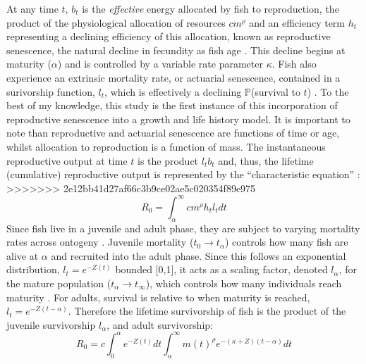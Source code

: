 \documentclass[a4paper]{article} %
\begin{document}
\begin{center}
\begin{minipage}{\linewidth}
At any time $t$, $b_{t}$ is the \textit{effective} energy allocated by fish to reproduction, the product of the physiological allocation of resources $cm^{\rho}$ and an efficiency term $h_t$ representing a declining efficiency of this allocation, known as reproductive senescence, the natural decline in fecundity as fish age \autocite{Stearns2000, Benoit2018, Vrtilek2018}. This decline begins at maturity ($\alpha$) and is controlled by a variable rate parameter $\kappa$. Fish also experience an extrinsic mortality rate, or actuarial senescence, contained in a surivorship function, $l_t$, which is effectively a declining $\mathbb{P}$(survival to $t$) \autocite{Beverton1959, Peterson1984, Charnov1993,Walters1993, Charnov2001, Benoit2018, Laird2010, Reznick2002, Reznick2006}. To the best of my knowledge, this study is the first instance of this incorporation of reproductive senescence into a growth and life history model. It is important to note than reproductive and actuarial senescence are functions of time or age, whilst allocation to reproduction is a function of mass. The instantaneous reproductive output at time $t$ is the product $l_{t}b_{t}$ and, thus, the lifetime (cumulative) reproductive output is represented by the ``characteristic equation'' \autocite{roff1992evolution, roff2002life, stearns1992evolution, Arendt2011, Tsoukali2016}:
>>>>>>> 2e12bb41d27af66c3b9ce02ae5c020354f89e975
\begin{equation}
    R_{0} = \int_{\alpha}^{\infty}cm^{\rho}h_{t}l_t dt
\end{equation}
Since fish live in a juvenile and adult phase, they are subject to varying mortality rates across ontogeny \autocite{Charnov2001}. Juvenile mortality ($t_0 \rightarrow t_{\alpha}$) controls how many fish are alive at $\alpha$ and recruited into the adult phase. Since this follows an exponential distribution, $l_t = e^{-Z(t)}$ bounded [0,1], it acts as a scaling factor, denoted $l_{\alpha}$, for the mature population ($t_{\alpha} \rightarrow t_{\infty}$), which controls how many individuals reach maturity \autocite{Charnov1990-agematurity}. For adults, survival is relative to when maturity is reached, $l_{t} = e^{-Z(t-\alpha)}$. Therefore the lifetime survivorship of fish is the product of the juvenile survivorship $l_{\alpha}$, and adult survivorship: 
\begin{equation}
    R_{0} = c\int_{0}^{\alpha}e^{-Z(t)}dt\int_{\alpha}^{\infty} m(t)^{\rho} e^{-(\kappa+Z)(t-\alpha)} dt \label{LHT_optimisation}
\end{equation}

\end{minipage}
\end{center}
\end{document}
